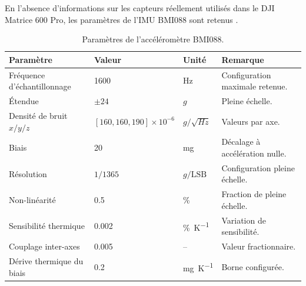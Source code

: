 \documentclass[11pt,a4paper,oneside]{report}
\begin{document}
	
	En l'absence d'informations sur les capteurs réellement utilisés dans le DJI Matrice 600 Pro, les paramètres de l'IMU BMI088 sont retenus \cite{BMI088_2024}.
	
	\begin{table}[H]
		\centering
		\caption{Paramètres de l'accéléromètre BMI088.}
		\label{tab_accel}
		\begin{tabularx}{\textwidth}{@{}L{5.2cm}L{3.3cm}L{2.8cm}Y@{}}
			\toprule
			\textbf{Paramètre} & \textbf{Valeur} & \textbf{Unité} & \textbf{Remarque}\\
			\midrule
			Fréquence d'échantillonnage & \num{1600} & \si{Hz} & Configuration maximale retenue.\\
			Étendue & $\pm\num{24}$ & $g$ & Pleine échelle.\\
			Densité de bruit $x/y/z$ & $[160,160,190]\times10^{-6}$ & $g/\sqrt{\si{Hz}}$ & Valeurs par axe.\\
			Biais & \num{20} & \si{mg} & Décalage à accélération nulle.\\
			Résolution & $1/1365$ & $g/\text{LSB}$ & Configuration pleine échelle.\\
			Non-linéarité & \num{0.5} & \si{\percent} & Fraction de pleine échelle.\\
			Sensibilité thermique & \num{0.002} & \si{\percent.K^{-1}} & Variation de sensibilité.\\
			Couplage inter-axes & \num{0.005} & -- & Valeur fractionnaire.\\
			Dérive thermique du biais & \num{0.2} & \si{mg.K^{-1}} & Borne configurée.\\
			\bottomrule
		\end{tabularx}
	\end{table}
	
\end{document}
